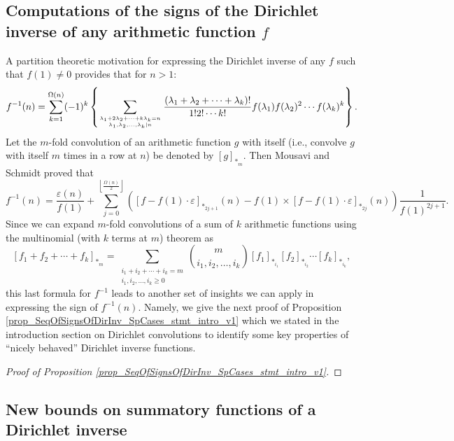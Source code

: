 \documentclass[11pt,reqno]{amsart}
\numberwithin{figure}{section}
\numberwithin{table}{section}
\theoremstyle{plain}
\numberwithin{theorem}{section}
\theoremstyle{definition}
\begin{document}
\subsection{Computations of the signs of the Dirichlet inverse of any arithmetic function $f$} 

A partition theoretic motivation for expressing the Dirichlet inverse of any $f$ such that 
$f(1) \neq 0$ provides that for $n > 1$: 
\begin{equation} 
\label{eqn_fInvDirInv_PartitionsFormula} 
f^{-1}(n) = \sum_{k=1}^{\Omega(n)} (-1)^k \left\{ 
     \sum_{{\lambda_1+2\lambda_2+\cdots+k\lambda_k=n} \atop {\lambda_1, \lambda_2, \ldots, \lambda_k | n}} 
     \frac{(\lambda_1+\lambda_2+\cdots+\lambda_k)!}{1! 2! \cdots k!} 
     f(\lambda_1) f(\lambda_2)^2 \cdots f(\lambda_k)^k\right\}. 
\end{equation} 
Let the $m$-fold convolution of an arithmetic function $g$ with itself (i.e., convolve 
$g$ with itself $m$ times in a row at $n$) be denoted by $[g]_{\ast_m}$. Then 
Mousavi and Schmidt proved that \cite{MOUSAVI-SCHMIDT-2019} 
\begin{equation} 
\label{eqn_} 
f^{-1}(n) = \frac{\varepsilon(n)}{f(1)} + 
     \sum_{j=0}^{\left\lfloor \frac{\Omega(n)}{2} \right\rfloor} \left( 
     [f-f(1)\cdot\varepsilon]_{\ast_{2j+1}}(n) - f(1) \times 
     [f-f(1)\cdot\varepsilon]_{\ast_{2j}}(n)
     \right) \frac{1}{f(1)^{2j+1}}. 
\end{equation} 
Since we can expand $m$-fold convolutions of a sum of $k$ arithmetic functions using the 
multinomial (with $k$ terms at $m$) theorem as 
\[
[f_1+f_2+\cdots+f_k]_{\ast_m} = \sum_{\substack{i_1+i_2+\cdots+i_k = m \\ i_1,i_2,\ldots,i_k \geq 0}} 
     \binom{m}{i_1,i_2,\ldots,i_k} [f_1]_{\ast_{i_1}} [f_2]_{\ast_{i_2}} \cdots 
     [f_k]_{\ast_{i_k}}, 
\]
this last formula for $f^{-1}$ leads to another set of insights we can apply in expressing the 
sign of $f^{-1}(n)$. Namely, we give the next proof of 
Proposition \ref{prop_SeqOfSignsOfDirInv_SpCases_stmt_intro_v1} which 
we stated in the introduction section on Dirichlet convolutions to identify some key 
properties of ``nicely behaved'' Dirichlet inverse functions. 

\begin{proof}[Proof of Proposition \ref{prop_SeqOfSignsOfDirInv_SpCases_stmt_intro_v1}]
\end{proof} 

\subsection{New bounds on summatory functions of a Dirichlet inverse} 
\end{document}
